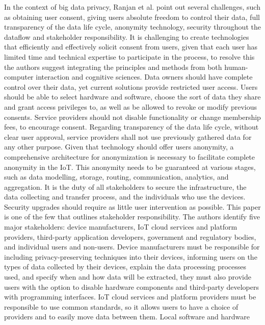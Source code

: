 In the context of big data privacy, Ranjan et al. \cite{perera2015big} point
out several challenges, such as obtaining user consent, giving users absolute
freedom to control their data, full transparency of the data life cycle, anonymity
technology, security throughout the dataflow and stakeholder responsibility.
It is challenging to create technologies that efficiently and effectively solicit
consent from users, given that each user has limited time and technical expertise
to participate in the process, to resolve this the authors suggest
integrating the principles and methods from both human-computer interaction and
cognitive sciences. Data owners should have complete control over their data,
yet current solutions provide restricted user access. Users should be able to
select hardware and software, choose the sort of data they share and grant access
privileges to, as well as be allowed to revoke or modify previous consents.
Service providers should not disable functionality or change membership fees,
to encourage consent. Regarding transparency of the data life cycle, without
clear user approval, service providers shall not use previously gathered data
for any other purpose. Given that technology should offer users anonymity, a
comprehensive architecture for anonymization is necessary to facilitate complete
anonymity in the IoT. This anonymity needs to be guaranteed at various stages,
such as data modelling, storage, routing, communication, analytics, and aggregation.
It is the duty of all stakeholders to secure the infrastructure, the data collecting
and transfer process, and the individuals who use the devices. Security upgrades
should require as little user intervention as possible.
This paper is one of the few that outlines stakeholder responsibility. The
authors identify five major stakeholders: device manufacturers, IoT cloud services
and platform providers, third-party application developers, government and regulatory
bodies, and individual users and non-users. Device manufacturers must be responsible
for including privacy-preserving techniques into their devices, informing users
on the types of data collected by their devices, explain the data processing
processes used, and specify when and how data will be extracted, they must also
provide users with the option to disable hardware components and third-party
developers with programming interfaces. IoT cloud services and platform providers
must be responsible to use common standards, so it allows users to have a choice
of providers and to easily move data between them. Local software and hardware
